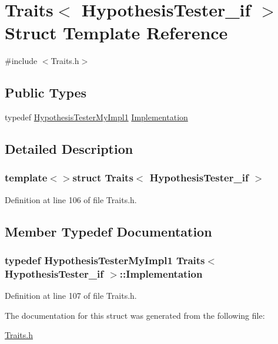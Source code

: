 \hypertarget{struct_traits_3_01_hypothesis_tester__if_01_4}{\section{Traits$<$ Hypothesis\-Tester\-\_\-if $>$ Struct Template Reference}
\label{struct_traits_3_01_hypothesis_tester__if_01_4}
}


{\ttfamily \#include $<$Traits.\-h$>$}

\subsection*{Public Types}
\begin{DoxyCompactItemize}
\item 
typedef \hyperlink{class_hypothesis_tester_my_impl1}{Hypothesis\-Tester\-My\-Impl1} \hyperlink{struct_traits_3_01_hypothesis_tester__if_01_4_a5fd3508bb7c3e86b2b16161c70eae52f}{Implementation}
\end{DoxyCompactItemize}


\subsection{Detailed Description}
\subsubsection*{template$<$$>$struct Traits$<$ Hypothesis\-Tester\-\_\-if $>$}



Definition at line 106 of file Traits.\-h.



\subsection{Member Typedef Documentation}
\hypertarget{struct_traits_3_01_hypothesis_tester__if_01_4_a5fd3508bb7c3e86b2b16161c70eae52f}{
\subsubsection[{Implementation}]{\setlength{\rightskip}{0pt plus 5cm}typedef {\bf Hypothesis\-Tester\-My\-Impl1} {\bf Traits}$<$ {\bf Hypothesis\-Tester\-\_\-if} $>$\-::{\bf Implementation}}}\label{struct_traits_3_01_hypothesis_tester__if_01_4_a5fd3508bb7c3e86b2b16161c70eae52f}


Definition at line 107 of file Traits.\-h.



The documentation for this struct was generated from the following file\-:\begin{DoxyCompactItemize}
\item 
\hyperlink{_traits_8h}{Traits.\-h}\end{DoxyCompactItemize}
